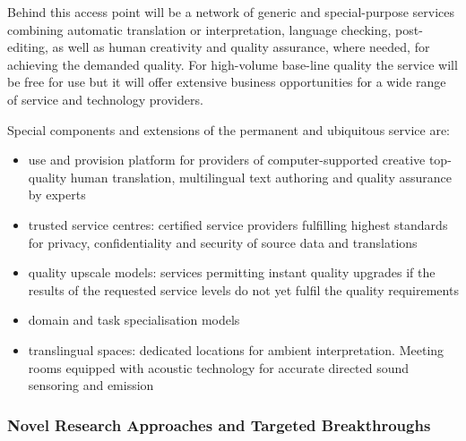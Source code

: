 \documentclass[10pt, plain]{../../metanetpaper}
\begin{document}
\begin{multicols}{2}
Behind this access point will be a network of generic and special-purpose services combining automatic translation or interpretation, language checking, post-editing, as well as human creativity and quality assurance, where needed, for achieving the demanded quality. For high-volume base-line quality the service will be free for use but it will offer extensive business opportunities for a wide range of service and technology providers.

Special components and extensions of the permanent and ubiquitous service are:

\begin{itemize}
\item use and provision platform for providers of computer-supported creative top-quality human translation, multilingual text authoring and quality assurance by experts
\item trusted service centres: certified service providers fulfilling highest standards for privacy, confidentiality and security of source data and translations
\item quality upscale models: services permitting instant quality upgrades if the results of the requested service levels do not yet fulfil the quality requirements
\item domain and task specialisation models
\item translingual spaces: dedicated locations for ambient interpretation. Meeting rooms equipped with acoustic technology for accurate directed sound sensoring and emission
\end{itemize}

\subsubsection{Novel Research Approaches and Targeted Breakthroughs}
\label{sec:novel-rese-appr-pt1}



\end{multicols}
\end{document}

